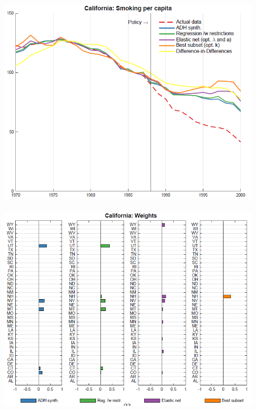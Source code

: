 \begin{frame}
  \frametitle{}
  \begin{center}
    \includegraphics[height=.9\textheight]{./resources/DI_CA_trends}
  \end{center}  
\end{frame}

\begin{frame}
  \frametitle{}
  \begin{center}
    \includegraphics[height=.9\textheight]{./resources/DI_CAstates}
  \end{center}  
\end{frame}



